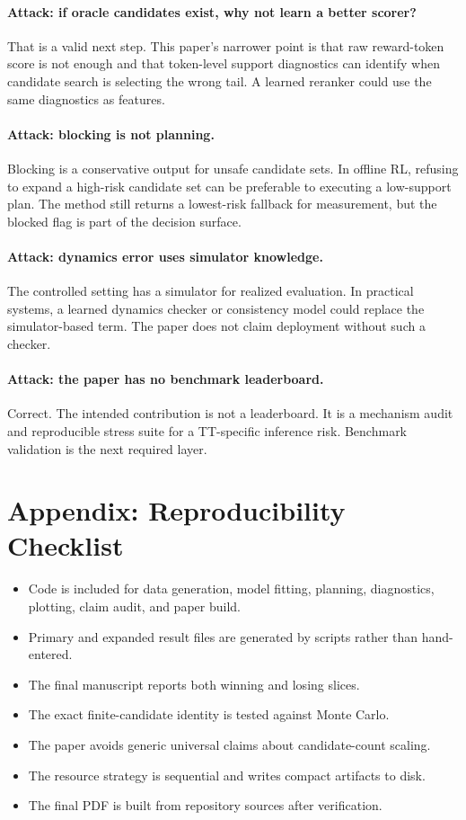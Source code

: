 \documentclass{article}
\begin{document}
\paragraph{Attack: if oracle candidates exist, why not learn a better scorer?}
That is a valid next step. This paper's narrower point is that raw reward-token score is not enough and that token-level support diagnostics can identify when candidate search is selecting the wrong tail. A learned reranker could use the same diagnostics as features.

\paragraph{Attack: blocking is not planning.}
Blocking is a conservative output for unsafe candidate sets. In offline RL, refusing to expand a high-risk candidate set can be preferable to executing a low-support plan. The method still returns a lowest-risk fallback for measurement, but the blocked flag is part of the decision surface.

\paragraph{Attack: dynamics error uses simulator knowledge.}
The controlled setting has a simulator for realized evaluation. In practical systems, a learned dynamics checker or consistency model could replace the simulator-based term. The paper does not claim deployment without such a checker.

\paragraph{Attack: the paper has no benchmark leaderboard.}
Correct. The intended contribution is not a leaderboard. It is a mechanism audit and reproducible stress suite for a TT-specific inference risk. Benchmark validation is the next required layer.

\section{Appendix: Reproducibility Checklist}

\begin{itemize}
\item Code is included for data generation, model fitting, planning, diagnostics, plotting, claim audit, and paper build.
\item Primary and expanded result files are generated by scripts rather than hand-entered.
\item The final manuscript reports both winning and losing slices.
\item The exact finite-candidate identity is tested against Monte Carlo.
\item The paper avoids generic universal claims about candidate-count scaling.
\item The resource strategy is sequential and writes compact artifacts to disk.
\item The final PDF is built from repository sources after verification.
\end{itemize}
\end{document}
